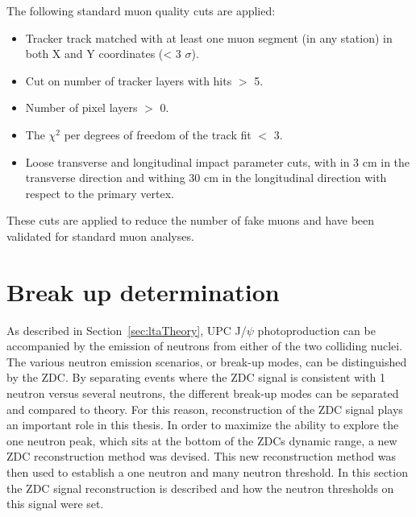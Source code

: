       The following standard muon quality cuts are applied:
      \begin{itemize}
        \item Tracker track matched with at least one muon segment 
          (in any station) in both X and Y coordinates (< 3 $\sigma$).
        \item Cut on number of tracker layers with hits $>$ 5.
        \item Number of pixel layers $>$ 0.
        \item The $\chi^{2}$ per degrees of freedom of the track fit $<$ 3. 
        \item Loose transverse and longitudinal impact parameter cuts, with in 3 
          cm in the transverse direction and withing 30 cm in the longitudinal 
          direction with respect to the primary vertex.
      \end{itemize}
      These cuts are applied to reduce the number of fake muons and have been 
        validated for standard muon analyses.

  \section{\label{sec:breakUpDet} Break up determination}
    As described in Section~\ref{sec:ltaTheory}, UPC J/$\psi$ photoproduction 
      can be accompanied by the emission of neutrons from either of the two 
      colliding nuclei.
    The various neutron emission scenarios, or break-up modes, can 
      be distinguished by the ZDC.
    By separating events where the ZDC signal is consistent with 1 neutron 
      versus several neutrons, the different break-up modes can be separated
      and compared to theory. 
    For this reason, reconstruction of the ZDC signal plays an important role 
      in this thesis. 
    In order to maximize the ability to explore the one neutron peak, which 
      sits at the bottom of the ZDCs dynamic range, a new ZDC reconstruction 
      method was devised. 
    This new reconstruction method was then used to establish a one neutron and
      many neutron threshold.
    In this section the ZDC signal reconstruction is described and how the 
      neutron thresholds on this signal were set.

